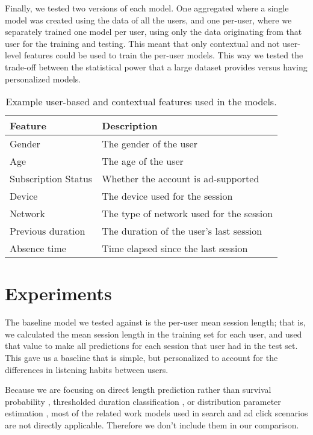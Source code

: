 Finally, we tested two versions of each model. One aggregated where a single model was created
using the data of all the users, and one per-user, where we separately trained one model
per user, using only the data originating from that user for the training and testing.
This meant that only contextual and not user-level features could be used
to train the per-user models.
This way we tested the trade-off between
the statistical power that a large dataset provides versus having personalized models.

\begin{table}
	\caption{Example user-based and contextual features used in the models.}
	\label{tab:prediction-features}
	\begin{tabular}{ll}
		\toprule
		Feature & Description\\
		\midrule
		Gender & The gender of the user \\
		Age & The age of the user \\
		Subscription Status & Whether the account is ad-supported \\
		\midrule
		Device & The device used for the session \\
		Network & The type of network used for the session \\
		Previous duration & The duration of the user's last session \\
		Absence time & Time elapsed since the last session \\
		\bottomrule
	\end{tabular}
\end{table}


\section{Experiments}

\label{sec:experiments}

The baseline model we tested against is the per-user mean session length;
that is, we calculated the mean session length in the training set for each user, and used that value
to make all predictions for each session that user had in the test set. This gave us a baseline
that is simple, but personalized to account for the differences in listening habits between
users.

Because we are focusing on direct length prediction rather than survival probability
\cite{Barbieri2016RSFclick}, thresholded duration classification \cite{lalmas2015gemini}, or
distribution parameter estimation \cite{Kim2014satisfaction, liu2010weibull}, most of the
related work models used in search and ad click scenarios are not directly applicable. Therefore
we don't include them in our comparison.

